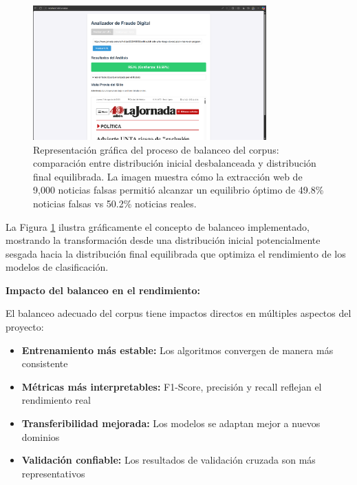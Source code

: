 \begin{figure}[htbp]
    \centering
    \includegraphics[width=0.8\textwidth]{Imagenes/balanceo_corpus_explicacion.png}
    \caption{Representación gráfica del proceso de balanceo del corpus: comparación entre distribución inicial desbalanceada y distribución final equilibrada. La imagen muestra cómo la extracción web de 9,000 noticias falsas permitió alcanzar un equilibrio óptimo de 49.8\% noticias falsas vs 50.2\% noticias reales.}
    \label{fig:balanceo_corpus}
\end{figure}

La Figura \ref{fig:balanceo_corpus} ilustra gráficamente el concepto de balanceo implementado, mostrando la transformación desde una distribución inicial potencialmente sesgada hacia la distribución final equilibrada que optimiza el rendimiento de los modelos de clasificación.

\textbf{Impacto del balanceo en el rendimiento:}

El balanceo adecuado del corpus tiene impactos directos en múltiples aspectos del proyecto:
\begin{itemize}
    \item \textbf{Entrenamiento más estable:} Los algoritmos convergen de manera más consistente
    \item \textbf{Métricas más interpretables:} F1-Score, precisión y recall reflejan el rendimiento real
    \item \textbf{Transferibilidad mejorada:} Los modelos se adaptan mejor a nuevos dominios
    \item \textbf{Validación confiable:} Los resultados de validación cruzada son más representativos
\end{itemize}

